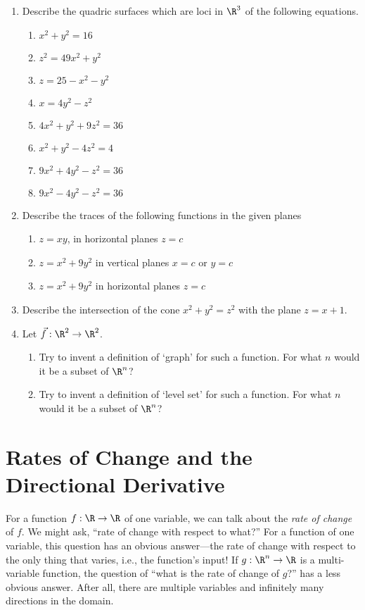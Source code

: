\begin{exercises}
\begin{enumerate}
	\item   Describe the quadric surfaces which are loci in $\R^3$
	of the following equations. 
	\begin{enumerate}
		\item $x^2 + y^2 = 16$ 
		\item $z^2 = 49x^2 + y^2$ 
		\item $z= 25 - x^2 - y^2$ 
		\item $x=4y^2-z^2$ 
		\item $4x^2 + y^2 + 9z^2 = 36$ 
		\item $x^2 + y^2 - 4z^2 = 4$ 
		\item $9x^2 + 4y^2 -z^2 = 36$ 
		\item $9x^2 - 4y^2 - z^2 = 36$
	\end{enumerate}

	\item   Describe the traces of the following functions in the given planes
	\begin{enumerate}
		\item $z=xy$, in horizontal planes  $z = c$ 
		\item $z=x^2+9y^2$ in vertical planes $x = c$ or $y = c$ 
		\item $z=x^2+9y^2$ in horizontal planes  $z = c$
	\end{enumerate}

	\item   Describe the intersection of the cone $x^2 + y^2 = z^2$ with
	the plane $z = x + 1$.  

	\item   Let $\vec f:\R^2 \to \R^2$.  
	\begin{enumerate}
		\item Try to invent a definition of `graph' for such a function.   For
		    what $n$ would it be a subset of $\R^n$? 
		\item Try to invent a definition of `level set' for such a function.
		    For what $n$ would it be a subset of $\R^n$?
	\end{enumerate}

\end{enumerate}
\end{exercises}

\section{Rates of Change and the Directional Derivative}
	
For a function $f:\R\to\R$ of one variable, we can talk about
the \emph{rate of change} of $f$.  We might ask, ``rate of change with
respect to what?''  For a function of one variable, this question has an obvious
answer---the rate of change with respect to the only thing that varies, i.e., the function's
input!
If $g:\R^n\to\R$ is a multi-variable function, the question of ``what is the rate of change
of $g$?'' has a less obvious answer.  After all, there are multiple variables and
infinitely many directions in the domain.

